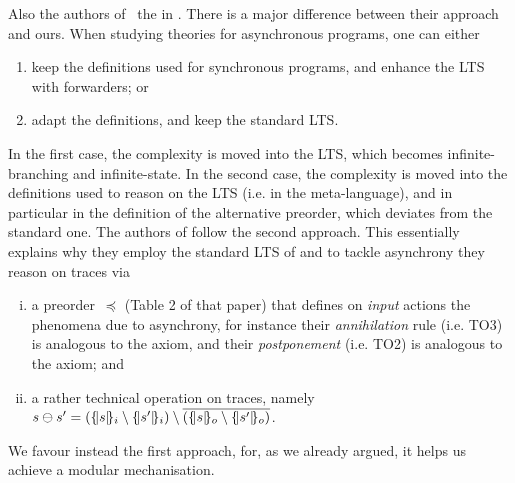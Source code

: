Also the authors of~\cite{DBLP:journals/iandc/BorealeNP02} the \mustpreorder in \ACCS.
There is a major difference between their approach and ours.
When studying theories for asynchronous programs, one can either
\begin{enumerate}[(1)]
  \item keep the definitions used for synchronous programs,
    and enhance the LTS with forwarders;
    or
  \item adapt the definitions, and keep the standard LTS.
\end{enumerate}
In the first case, the complexity is moved into the LTS, which
becomes infinite-branching and infinite-state.
In the second case, the complexity is moved into the definitions
used to reason on the LTS (i.e. in the meta-language), and in
particular in the definition of the alternative preorder, which
deviates from the standard one. The authors of
\cite{DBLP:journals/iandc/BorealeNP02} follow the second approach. %
This essentially explains why they employ the standard LTS of \CCS
and to tackle asynchrony they reason on traces via
\begin{enumerate}[(i)]
\item a preorder~$\preceq$ (Table 2 of that paper) that defines on {\em input} actions
  the phenomena due to asynchrony, for instance their {\em
    annihilation} rule (i.e. TO3) is analogous to the \outputfeedback axiom, and
  their {\em postponement} (i.e. TO2) is analogous to the
  \outputcommutativity axiom; and
\item a rather technical operation on traces, namely %
  $s \ominus s' = ( \mset{s}_{i} \setminus
  \mset{s'}_{i}) \setminus \co{( \mset{s}_{o} \setminus  \mset{s'}_{o}
    )}$.
\end{enumerate}
We favour instead the first approach, for, as we already argued,
it helps us achieve a modular mechanisation.

